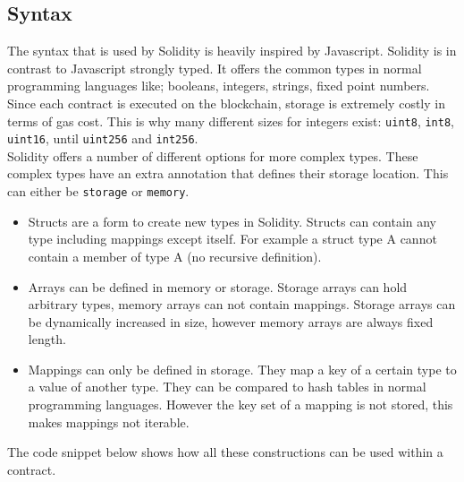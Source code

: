 \documentclass[a4paper]{article}
\begin{document}
\subsection{Syntax}
The syntax that is used by Solidity is heavily inspired by Javascript. Solidity is in contrast to Javascript strongly typed. It offers the common types in normal programming languages like; booleans, integers, strings, fixed point numbers. Since each contract is executed on the blockchain, storage is extremely costly in terms of gas cost. This is why many different sizes for integers exist: \texttt{uint8}, \texttt{int8}, \texttt{uint16}, until \texttt{uint256} and \texttt{int256}. \\
Solidity offers a number of different options for more complex types. These complex types have an extra annotation that defines their storage location. This can either be \texttt{storage} or \texttt{memory}. 
\begin{itemize}
    \item Structs are a form to create new types in Solidity. Structs can contain any type including mappings except itself. For example a struct type A cannot contain a member of type A (no recursive definition).  
    \item Arrays can be defined in memory or storage. Storage arrays can hold arbitrary types, memory arrays can not contain mappings. Storage arrays can be dynamically increased in size, however memory arrays are always fixed length.  
    \item Mappings can only be defined in storage. They map a key of a certain type to a value of another type. They can be compared to hash tables in normal programming languages. However the key set of a mapping is not stored, this makes mappings not iterable. 
\end{itemize}
The code snippet below shows how all these constructions can be used within a contract.
\end{document}

